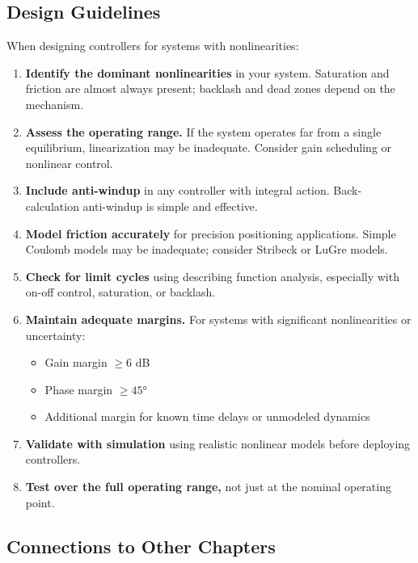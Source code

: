 \subsection{Design Guidelines}

When designing controllers for systems with nonlinearities:

\begin{enumerate}
    \item \textbf{Identify the dominant nonlinearities} in your system. Saturation and friction are almost always present; backlash and dead zones depend on the mechanism.

    \item \textbf{Assess the operating range.} If the system operates far from a single equilibrium, linearization may be inadequate. Consider gain scheduling or nonlinear control.

    \item \textbf{Include anti-windup} in any controller with integral action. Back-calculation anti-windup is simple and effective.

    \item \textbf{Model friction accurately} for precision positioning applications. Simple Coulomb models may be inadequate; consider Stribeck or LuGre models.

    \item \textbf{Check for limit cycles} using describing function analysis, especially with on-off control, saturation, or backlash.

    \item \textbf{Maintain adequate margins.} For systems with significant nonlinearities or uncertainty:
    \begin{itemize}
        \item Gain margin $\geq 6$ dB
        \item Phase margin $\geq 45°$
        \item Additional margin for known time delays or unmodeled dynamics
    \end{itemize}

    \item \textbf{Validate with simulation} using realistic nonlinear models before deploying controllers.

    \item \textbf{Test over the full operating range,} not just at the nominal operating point.
\end{enumerate}

\subsection{Connections to Other Chapters}


